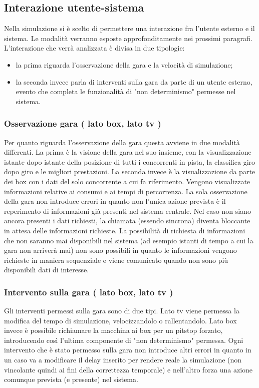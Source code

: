 \subsection{Interazione utente-sistema}
Nella simulazione si è scelto di permettere una interazione fra l'utente esterno
e il sistema. Le modalità verranno esposte approfonditamente nei prossimi
paragrafi. L'interazione che verrà analizzata è divisa in due tipologie:
\begin{itemize}
\item la
prima riguarda l'osservazione della gara e la velocità di simulazione;
\item la
seconda invece parla di interventi sulla gara da parte di un utente esterno,
evento che completa le funzionalità di "non determinismo" permesse nel sistema.
\end{itemize}
\subsubsection{Osservazione gara ( lato box, lato tv )}
Per quanto riguarda l'osservazione della gara questa avviene in due modalità
differenti. La prima è la visione della gara nel suo insieme, con la
visualizzazione istante dopo istante della posizione di tutti i concorrenti in
pista, la classifica giro dopo giro e le migliori prestazioni. La seconda invece
è la visualizzazione da parte dei box con i dati del solo concorrente a cui fa
riferimento. Vengono visualizzate informazioni relative ai consumi e ai tempi di
percorrenza. La sola osservazione della gara non introduce errori in quanto non
l'unica azione prevista è il reperimento di informazioni già presenti nel
sistema centrale. Nel caso non siano ancora presenti i dati richiesti, la
chiamata (essendo sincrona) diventa bloccante in attesa delle informazioni
richieste. La possibilità di richiesta di informazioni che non saranno mai
disponibili nel sistema (ad esempio istanti di tempo a cui la gara non arriverà
mai) non sono possibili in quanto le informazioni vengono richieste in
maniera sequenziale e viene comunicato quando non sono più disponibili dati di
interesse.
\subsubsection{Intervento sulla gara ( lato box, lato tv )}
Gli interventi permessi sulla gara sono di due tipi. Lato tv
viene permessa la modifica del tempo di simulazione, velocizzandolo o
rallentandolo. Lato box invece è possibile richiamare la macchina ai box per un
pitstop forzato, introducendo così l'ultima componente di "non determinismo"
permessa.
Ogni intervento che è stato permesso sulla gara non introduce altri errori in
quanto in un caso va a modificare il delay inserito per rendere reale la
simulazione (non vincolante quindi ai fini della correttezza temporale)
e nell'altro forza una azione comunque prevista (e presente) nel
sistema. 
